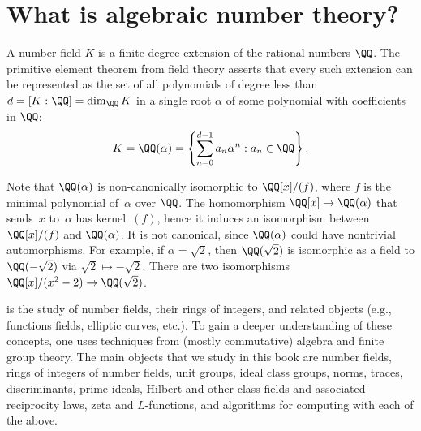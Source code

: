 \section{What is algebraic number theory?}

A number field $K$ is a finite degree extension of the rational
numbers $\QQ$.  The primitive element theorem from field theory
asserts that every such extension can be represented as the set of all
polynomials of degree less than $d = [K:\QQ] = \dim_{\QQ} K$ in
a single root $\alpha$ of some polynomial with coefficients in $\QQ$:
$$
  K = \QQ(\alpha) = \left\{ \sum_{n=0}^{d-1} a_n \alpha^n : a_n\in\QQ \right\}.
$$

Note that
$\QQ(\alpha)$ is non-canonically isomorphic to $\QQ[x]/(f)$, where $f$
is the minimal polynomial of~$\alpha$ over $\QQ$.
The homomorphism $\QQ[x]\to\QQ(\alpha)$ that sends~$x$ to~$\alpha$
has kernel~$(f)$, hence it induces an isomorphism between
$\QQ[x]/(f)$ and $\QQ(\alpha)$.
It is not canonical, since $\QQ(\alpha)$ could
have nontrivial automorphisms.  For example, if $\alpha=\sqrt{2}$, then
$\QQ(\sqrt{2})$ is isomorphic as a field to $\QQ(-\sqrt{2})$ via
$\sqrt{2}\mapsto -\sqrt{2}$.  There are two isomorphisms
$\QQ[x]/(x^2-2)\to \QQ(\sqrt{2})$.


 is the study of number fields, their rings of
integers, and related objects (e.g., functions fields, elliptic curves, etc.).
To gain a deeper understanding of these concepts, one uses techniques from
(mostly commutative) algebra and finite group theory.
The main objects that we study in this book are number fields, rings of
integers of number fields, unit groups, ideal class groups, norms, traces,
discriminants, prime ideals, Hilbert and other class fields and
associated reciprocity laws, zeta and $L$-functions, and algorithms
for computing with each of the above.

